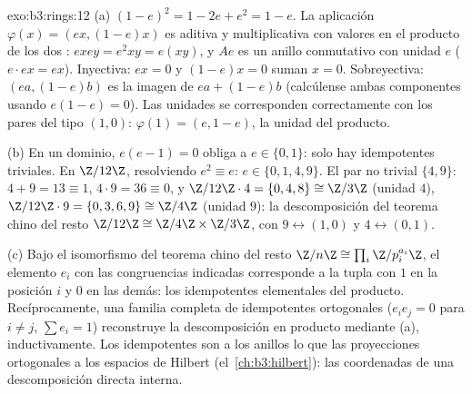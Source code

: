 \begin{solution}{exo:b3:rings:12}
(a) $(1-e)^2 = 1 - 2e + e^2 = 1 - e$. La aplicación $\varphi(x) =
(ex, (1-e)x)$ es aditiva y multiplicativa con valores en el producto de
los dos : $exey = e^2xy = e(xy)$, y
$Ae$ es un anillo conmutativo con unidad $e$ ($e\cdot ex = ex$).
Inyectiva: $ex = 0$ y $(1-e)x = 0$ suman $x = 0$. Sobreyectiva: $(ea,
(1-e)b)$ es la imagen de $ea + (1-e)b$ (calcúlense ambas componentes
usando $e(1-e) = 0$). Las unidades se corresponden correctamente con los
pares del tipo $(1, 0)$: $\varphi(1) = (e, 1-e)$, la unidad del
producto.

(b) En un dominio, $e(e - 1) = 0$ obliga a $e \in \{0, 1\}$: solo hay
idempotentes triviales. En $\Z/12\Z$, resolviendo $e^2 \equiv e$: $e
\in \{0, 1, 4, 9\}$. El par no trivial $\{4, 9\}$: $4 + 9 =
13 \equiv 1$, $4\cdot9 = 36 \equiv 0$, y $\Z/12\Z\cdot4 =
\{0, 4, 8\} \cong \Z/3\Z$ (unidad $4$), $\Z/12\Z\cdot9 = \{0,
3, 6, 9\} \cong \Z/4\Z$ (unidad $9$): la descomposición del teorema
chino del resto $\Z/12\Z \cong \Z/4\Z\times\Z/3\Z$, con
$9 \leftrightarrow
(1, 0)$ y $4 \leftrightarrow (0, 1)$.

(c) Bajo el isomorfismo del teorema chino del resto
$\Z/n\Z \cong \prod_i
\Z/p_i^{a_i}\Z$, el elemento $e_i$ con las congruencias indicadas
corresponde a la tupla con $1$ en la posición $i$ y $0$ en las demás:
los idempotentes elementales del producto. Recíprocamente, una familia
completa de idempotentes ortogonales ($e_ie_j = 0$ para $i \neq j$,
$\sum e_i = 1$) reconstruye la descomposición en producto mediante (a),
inductivamente. Los idempotentes son a los anillos lo que las
proyecciones ortogonales a los espacios de Hilbert
(el~\cref{ch:b3:hilbert}): las coordenadas de una descomposición directa
interna.
\end{solution}

